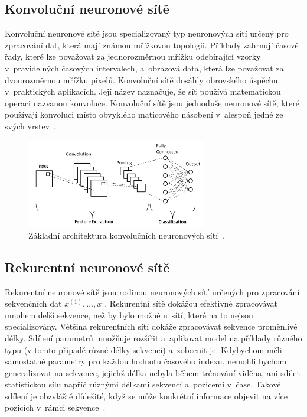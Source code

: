 \subsection{Konvoluční neuronové sítě}
\label{CNNs}
Konvoluční neuronové sítě jsou specializovaný typ neuronových sítí určený pro zpracování dat, která mají známou mřížkovou topologii. Příklady zahrnují časové řady, které lze považovat za jednorozměrnou mřížku odebírající vzorky v~pravidelných časových intervalech, a~obrazová data, která lze považovat za dvourozměrnou mřížku pixelů. Konvoluční sítě dosáhly obrovského úspěchu v~praktických aplikacích. Její název naznačuje, že síť používá matematickou operaci nazvanou konvoluce. Konvoluční sítě jsou jednoduše neuronové sítě, které používají konvoluci místo obvyklého maticového násobení v~alespoň jedné ze svých vrstev~\cite{Goodfellow-et-al-2016}.
\begin{figure}[hbt]
	\centering
	\includegraphics[width=0.7\textwidth]{obrazky-figures/cnn.png}
	\caption{Základní architektura konvolučních neuronových sítí~\cite{cnn_arch}.}
	\label{cnn_pic}
\end{figure}

\subsection{Rekurentní neuronové sítě}
Rekurentní neuronové sítě jsou rodinou neuronových sítí určených pro zpracování sekvenčních dat $x^{(1)},\dots,x^{\tau}$. Rekurentní sítě dokážou efektivně zpracovávat mnohem delší sekvence, než by bylo možné u~sítí, které na to nejsou specializovány. Většina rekurentních sítí dokáže zpracovávat sekvence proměnlivé délky. Sdílení parametrů umožňuje rozšířit a~aplikovat model na příklady různého typu (v tomto případě různé délky sekvencí) a~zobecnit je. Kdybychom měli samostatné parametry pro každou hodnotu časového indexu, nemohli bychom generalizovat na sekvence, jejichž délka nebyla během trénování viděna, ani sdílet statistickou sílu napříč různými délkami sekvencí a~pozicemi v~čase. Takové sdílení je obzvláště důležité, když se může konkrétní informace objevit na více pozicích v~rámci sekvence~\cite{Goodfellow-et-al-2016}.

